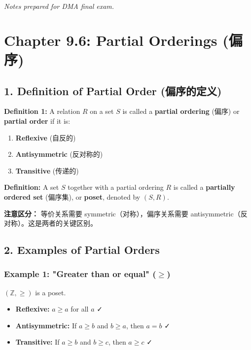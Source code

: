 \documentclass[10pt,a4paper,openany]{ctexbook}
\theoremstyle{definition}
\theoremstyle{remark}
\renewenvironment{quote}
  {\list{}{\leftmargin=1em\rightmargin=0pt\topsep=0.5pt\partopsep=0pt}\item[]}
  {\endlist}
\begin{document}
\textit{Notes prepared for DMA final exam.}


\section{Chapter 9.6: Partial Orderings (偏序)}

\vspace{-2pt}

\subsection{1. Definition of Partial Order (偏序的定义)}

\textbf{Definition 1:} A relation $R$ on a set $S$ is called a \textbf{partial ordering} (偏序) or \textbf{partial order} if it is:
\begin{enumerate}
\item \textbf{Reflexive} (自反的)
\item \textbf{Antisymmetric} (反对称的)
\item \textbf{Transitive} (传递的)

\end{enumerate}

\textbf{Definition:} A set $S$ together with a partial ordering $R$ is called a \textbf{partially ordered set} (偏序集), or \textbf{poset}, denoted by $(S, R)$.
\begin{quote}
\textbf{注意区分：} 等价关系需要 symmetric（对称），偏序关系需要 antisymmetric（反对称）。这是两者的关键区别。

\end{quote}
\vspace{-2pt}

\subsection{2. Examples of Partial Orders}

\subsubsection{Example 1: "Greater than or equal" ($\ge$)}

$( \mathbb{Z}, \ge )$ is a poset.
\begin{itemize}
\item \textbf{Reflexive:} $a \ge a$ for all $a$ ✓
\item \textbf{Antisymmetric:} If $a \ge b$ and $b \ge a$, then $a = b$ ✓
\item \textbf{Transitive:} If $a \ge b$ and $b \ge c$, then $a \ge c$ ✓

\end{itemize}
\end{document}

